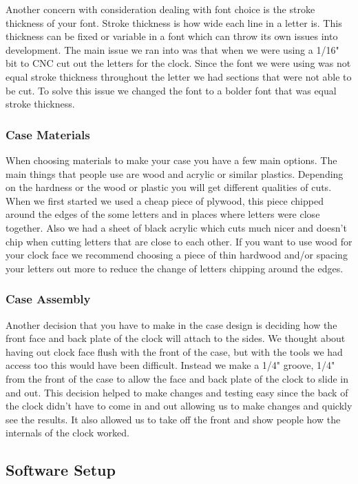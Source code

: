 \documentclass[onecolumn, draftclsnofoot,10pt, compsoc]{IEEEtran}
\begin{document}
Another concern with consideration dealing with font choice is the stroke thickness of your font.
Stroke thickness is how wide each line in a letter is.
This thickness can be fixed or variable in a font which can throw its own issues into development.
The main issue we ran into was that when we were using a 1/16" bit to CNC cut out the letters for the clock.
Since the font we were using was not equal stroke thickness throughout the letter we had sections that were not able to be cut.
To solve this issue we changed the font to a bolder font that was equal stroke thickness.

\subsubsection{Case Materials}
When choosing materials to make your case you have a few main options.
The main things that people use are wood and acrylic or similar plastics.
Depending on the hardness or the wood or plastic you will get different qualities of cuts.
When we first started we used a cheap piece of plywood, this piece chipped around the edges of the some letters and in places where letters were close together.
Also we had a sheet of black acrylic which cuts much nicer and doesn't chip when cutting letters that are close to each other.
If you want to use wood for your clock face we recommend choosing a piece of thin hardwood and/or spacing your letters out more to reduce the change of letters chipping around the edges.

\subsubsection{Case Assembly}
Another decision that you have to make in the case design is deciding how the front face and back plate of the clock will attach to the sides.
We thought about having out clock face flush with the front of the case, but with the tools we had access too this would have been difficult.
Instead we make a 1/4" groove, 1/4" from the front of the case to allow the face and back plate of the clock to slide in and out.
This decision helped to make changes and testing easy since the back of the clock didn't have to come in and out allowing us to make changes and quickly see the results.
It also allowed us to take off the front and show people how the internals of the clock worked.
\subsection{Software Setup}
\end{document}
